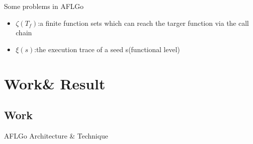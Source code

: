 \documentclass[10pt,aspectratio=43]{beamer}
\begin{document}
\begin{frame}{Some problems in AFLGo}
{    }
    {
        \begin{itemize}
            \item  $\zeta(T_f)$:a finite function sets which can reach the targer function via the call chain
            \item  $\xi(s)$:the execution trace of a seed s(functional level)
        \end{itemize} 
        
    }
\end{frame}   

\section{Work\& Result}
\subsection{Work}
\begin{frame}{AFLGo Architecture \& Technique}
\end{frame}
\end{document}
